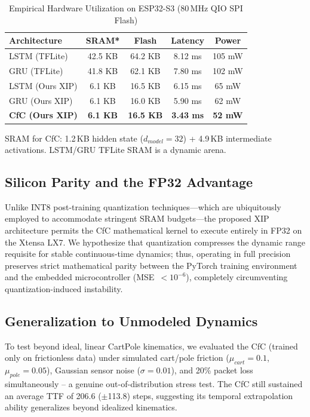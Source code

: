 \documentclass[conference]{IEEEtran}
\begin{document}
\begin{table}[t]
\centering
\caption{Empirical Hardware Utilization on ESP32-S3 (80\,MHz QIO SPI Flash)}
\label{tab:hw}
\begin{tabular}{@{}lcccc@{}}
\hline
\textbf{Architecture} & \textbf{SRAM*} & \textbf{Flash} & \textbf{Latency} & \textbf{Power} \\
\hline
LSTM (TFLite) & 42.5 KB & 64.2 KB & 8.12 ms & 105 mW \\
GRU (TFLite) & 41.8 KB & 62.1 KB & 7.80 ms & 102 mW \\
LSTM (Ours XIP) & 6.1 KB & 16.5 KB & 6.15 ms & 65 mW \\
GRU (Ours XIP) & 6.1 KB & 16.0 KB & 5.90 ms & 62 mW \\
\textbf{CfC (Ours XIP)} & \textbf{6.1 KB} & \textbf{16.5 KB} & \textbf{3.43 ms} & \textbf{52 mW} \\
\hline
\end{tabular}
\vspace{3pt}

{\footnotesize *SRAM for CfC: 1.2\,KB hidden state ($d_{model}=32$) + 4.9\,KB intermediate activations. LSTM/GRU TFLite SRAM is a dynamic arena.\par}
\end{table}

\subsection{Silicon Parity and the FP32 Advantage}
Unlike INT8 post-training quantization techniques---which are ubiquitously employed to accommodate stringent SRAM budgets---the proposed XIP architecture permits the CfC mathematical kernel to execute entirely in FP32 on the Xtensa LX7. We hypothesize that quantization compresses the dynamic range requisite for stable continuous-time dynamics; thus, operating in full precision preserves strict mathematical parity between the PyTorch training environment and the embedded microcontroller (MSE~$<10^{-6}$), completely circumventing quantization-induced instability.

\subsection{Generalization to Unmodeled Dynamics}
To test beyond ideal, linear CartPole kinematics, we evaluated the CfC (trained only on frictionless data) under simulated cart/pole friction ($\mu_{cart}=0.1$, $\mu_{pole}=0.05$), Gaussian sensor noise ($\sigma=0.01$), and 20\% packet loss simultaneously -- a genuine out-of-distribution stress test. The CfC still sustained an average TTF of 206.6 ($\pm$113.8) steps, suggesting its temporal extrapolation ability generalizes beyond idealized kinematics.
\end{document}
